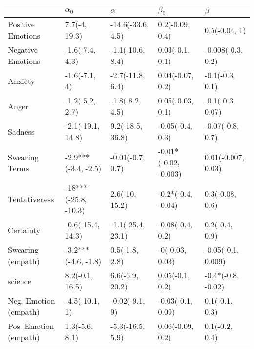 \begin{tabular}{lllll}
\toprule
{} &            $\alpha_0$ &           $\alpha$ &              $\beta_0$ &             $\beta$ \\
\midrule
Positive Emotions     &         7.7(-4, 19.3) &  -14.6(-33.6, 4.5) &        0.2(-0.09, 0.4) &       0.5(-0.04, 1) \\
Negative Emotions     &       -1.6(-7.4, 4.3) &   -1.1(-10.6, 8.4) &        0.03(-0.1, 0.1) &   -0.008(-0.3, 0.2) \\
Anxiety               &         -1.6(-7.1, 4) &   -2.7(-11.8, 6.4) &       0.04(-0.07, 0.2) &     -0.1(-0.3, 0.1) \\
Anger                 &       -1.2(-5.2, 2.7) &    -1.8(-8.2, 4.5) &       0.05(-0.03, 0.1) &    -0.1(-0.3, 0.07) \\
Sadness               &     -2.1(-19.1, 14.8) &   9.2(-18.5, 36.8) &       -0.05(-0.4, 0.3) &    -0.07(-0.8, 0.7) \\
Swearing Terms        &   -2.9***(-3.4, -2.5) &   -0.01(-0.7, 0.7) &  -0.01*(-0.02, -0.003) &  0.01(-0.007, 0.03) \\
Tentativeness         &  -18***(-25.8, -10.3) &     2.6(-10, 15.2) &     -0.2*(-0.4, -0.04) &     0.3(-0.08, 0.6) \\
Certainty             &     -0.6(-15.4, 14.3) &  -1.1(-25.4, 23.1) &       -0.08(-0.4, 0.2) &      0.2(-0.4, 0.9) \\
Swearing (empath)     &   -3.2***(-4.6, -1.8) &     0.5(-1.8, 2.8) &        -0(-0.03, 0.03) &  -0.05(-0.1, 0.009) \\
science               &       8.2(-0.1, 16.5) &    6.6(-6.9, 20.2) &        0.05(-0.1, 0.2) &  -0.4*(-0.8, -0.02) \\
Neg. Emotion (empath) &        -4.5(-10.1, 1) &     -0.02(-9.1, 9) &      -0.03(-0.1, 0.09) &      0.1(-0.1, 0.3) \\
Pos. Emotion (empath) &        1.3(-5.6, 8.1) &   -5.3(-16.5, 5.9) &       0.06(-0.09, 0.2) &      0.1(-0.2, 0.4) \\
\bottomrule
\end{tabular}
